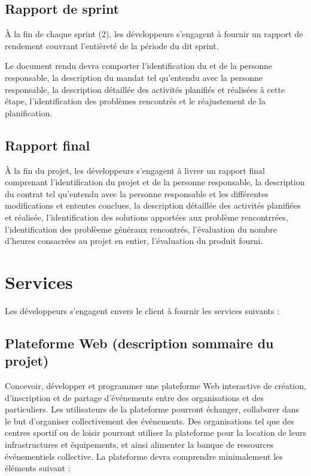 \documentclass[letter,12pt]{exam}
\begin{document}
\subsection{Rapport de sprint}

À la fin de chaque sprint (2), les développeurs s'engagent à fournir un
rapport de rendement couvrant l'entièreté de la période du dit sprint.

Le document rendu devra comporter l'identification du et de la personne
responsable, la description du mandat tel qu'entendu avec la personne
responsable, la description détaillée des activités planifiés et
réalisées à cette étape, l'identification des problèmes rencontrés et le
réajustement de la planification.

\subsection{Rapport final}

À la fin du projet, les développeurs s'engagent à livrer un rapport
final comprenant l'identification du projet et de la personne
responsable, la description du contrat tel qu'entendu avec la personne
responsable et les différentes modifications et ententes conclues, la
description détaillée des activités planifiées et réalisée,
l'identification des solutions apportées aux problème rencontrrées,
l'identification des problèeme généraux rencontrés, l'évaluation du
nombre d'heures consacrées au projet en entier, l'évaluation du produit
fourni.

\section{Services}

Les développeurs s'engagent envers le client à fournir les services
suivants :

\subsection{Plateforme Web (description sommaire du
projet)}

Concevoir, développer et programmer une plateforme Web interactive de
création, d'inscription et de partage d'événements entre des
organisations et des particuliers. Les utilisateurs de la plateforme
pourront échanger, collaborer dans le but d'organiser collectivement des
événements. Des organisations tel que des centres sportif ou de loisir
pourront utiliser la plateforme pour la location de leurs
infrastructures et équipements, et ainsi alimenter la banque de
ressources événementiels collective. La plateforme devra comprendre
minimalement les éléments suivant :
\end{document}
